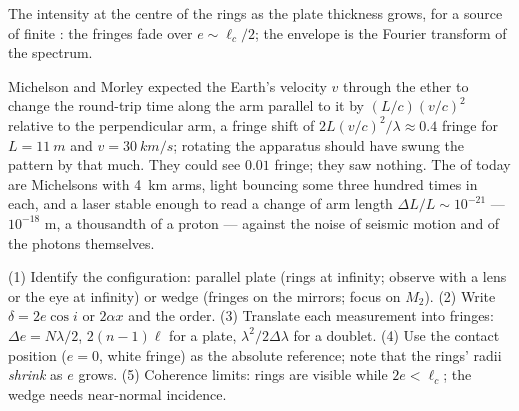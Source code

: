 \begin{omfigure}

{\small The intensity at the centre of the rings as the plate thickness
grows, for a source of finite : the fringes fade over
$e \sim \ell_c/2$; the envelope is the Fourier transform of the spectrum.}
\end{omfigure}

\begin{remark}\label{rem:b2:michelson:history}
Michelson and Morley expected the Earth's velocity $v$ through the
ether to change the round-trip time along the arm parallel to it by
$(L/c)(v/c)^2$ relative to the perpendicular arm, a fringe shift of
$2L(v/c)^2/\lambda \approx 0.4$ fringe for $L = \qty{11}{m}$ and $v = \qty{30}{km/s}$;
rotating the apparatus should have swung the pattern by that much.
They could see $0.01$ fringe; they saw nothing. The  of today are Michelsons with \qty{4}{km} arms, light bouncing
some three hundred times in each, and a laser stable enough to read a
change of arm length $\Delta L/L \sim 10^{-21}$ --- $10^{-18}$ m, a thousandth
of a proton --- against the noise of seismic motion and of the photons
themselves.
\end{remark}

\begin{method}\label{met:b2:michelson:method}
(1) Identify the configuration: parallel plate (rings at infinity;
observe with a lens or the eye at infinity) or wedge (fringes on the
mirrors; focus on $M_2$). (2) Write $\delta = 2e\cos i$ or $2\alpha x$ and the
order. (3) Translate each measurement into fringes: $\Delta e = N\lambda/2$,
$2(n - 1)\ell$ for a plate, $\lambda^2/2\Delta\lambda$ for a doublet. (4) Use the
contact position ($e = 0$, white fringe) as the absolute reference;
note that the rings' radii \emph{shrink} as $e$ grows. (5) Coherence
limits: rings are visible while $2e < \ell_c$; the wedge needs
near-normal incidence.
\end{method}

